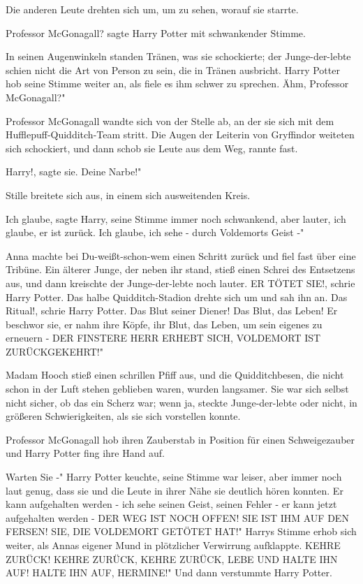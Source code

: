 Die anderen Leute drehten sich um, um zu sehen, worauf sie starrte.

\glqq Professor McGonagall?\grqq{} sagte Harry Potter mit schwankender Stimme.

In seinen Augenwinkeln standen Tränen, was sie schockierte; der Junge-der-lebte
schien nicht die Art von Person zu sein, die in Tränen ausbricht. Harry Potter
hob seine Stimme weiter an, als fiele es ihm schwer zu sprechen. \glqq Ähm,
Professor McGonagall?"

Professor McGonagall wandte sich von der Stelle ab, an der sie sich mit dem
Hufflepuff-Quidditch-Team stritt. Die Augen der Leiterin von Gryffindor weiteten
sich schockiert, und dann schob sie Leute aus dem Weg, rannte fast.

\glqq Harry!\grqq{}, sagte sie. \glqq Deine Narbe!"

Stille breitete sich aus, in einem sich ausweitenden Kreis.

\glqq Ich glaube\grqq{}, sagte Harry, seine Stimme immer noch schwankend, aber
lauter, \glqq ich glaube, er ist zurück. Ich glaube, ich sehe - durch Voldemorts
Geist -"

Anna machte bei Du-weißt-schon-wem einen Schritt zurück und fiel fast über eine
Tribüne. Ein älterer Junge, der neben ihr stand, stieß einen Schrei des
Entsetzens aus, und dann kreischte der Junge-der-lebte noch lauter. \glqq ER
TÖTET SIE!\grqq{}, schrie Harry Potter. Das halbe Quidditch-Stadion drehte sich
um und sah ihn an. \glqq Das Ritual!\grqq{}, schrie Harry Potter. \glqq Das Blut
seiner Diener! Das Blut, das Leben! Er beschwor sie, er nahm ihre Köpfe, ihr
Blut, das Leben, um sein eigenes zu erneuern - DER FINSTERE HERR ERHEBT SICH,
VOLDEMORT IST ZURÜCKGEKEHRT!"

Madam Hooch stieß einen schrillen Pfiff aus, und die Quidditchbesen, die nicht
schon in der Luft stehen geblieben waren, wurden langsamer. Sie war sich selbst
nicht sicher, ob das ein Scherz war; wenn ja, steckte Junge-der-lebte oder
nicht, in größeren Schwierigkeiten, als sie sich vorstellen konnte.

Professor McGonagall hob ihren Zauberstab in Position für einen Schweigezauber
und Harry Potter fing ihre Hand auf.

\glqq Warten Sie -" Harry Potter keuchte, seine Stimme war leiser, aber immer
noch laut genug, dass sie und die Leute in ihrer Nähe sie deutlich hören
konnten. \glqq Er kann aufgehalten werden - ich sehe seinen Geist, seinen Fehler
- er kann jetzt aufgehalten werden - DER WEG IST NOCH OFFEN! SIE IST IHM AUF DEN
FERSEN! SIE, DIE VOLDEMORT GETÖTET HAT!" Harrys Stimme erhob sich weiter, als
Annas eigener Mund in plötzlicher Verwirrung aufklappte. \glqq KEHRE ZURÜCK!
KEHRE ZURÜCK, KEHRE ZURÜCK, LEBE UND HALTE IHN AUF! HALTE IHN AUF, HERMINE!" Und
dann verstummte Harry Potter.

